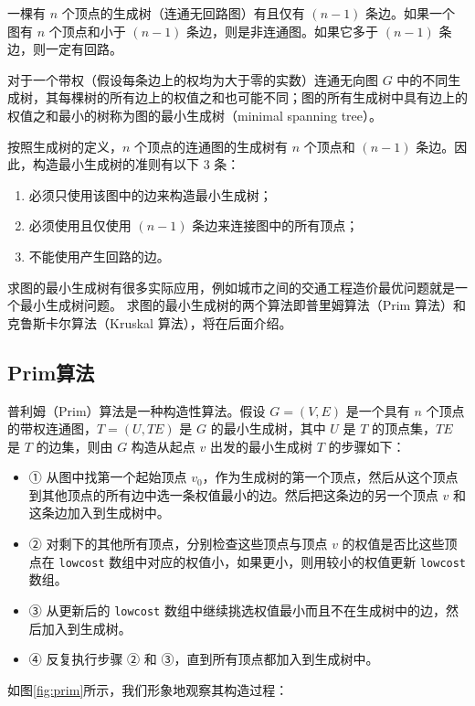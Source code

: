 \documentclass[lang=cn,newtx,10pt,scheme=chinese]{../elegantbook}
\begin{document}
一棵有 $n$ 个顶点的生成树（连通无回路图）有且仅有 $(n-1)$ 条边。如果一个图有 $n$ 个顶点和小于 $(n-1)$ 条边，则是非连通图。如果它多于 $(n-1)$ 条边，则一定有回路。

对于一个带权（假设每条边上的权均为大于零的实数）连通无向图 $G$ 中的不同生成树，其每棵树的所有边上的权值之和也可能不同；图的所有生成树中具有边上的权值之和最小的树称为图的最小生成树（minimal spanning tree）。

按照生成树的定义，$n$ 个顶点的连通图的生成树有 $n$ 个顶点和 $(n-1)$ 条边。因此，构造最小生成树的准则有以下 3 条：

\begin{enumerate}
  \item 必须只使用该图中的边来构造最小生成树；
  \item 必须使用且仅使用 $(n-1)$ 条边来连接图中的所有顶点；
  \item 不能使用产生回路的边。
\end{enumerate}

求图的最小生成树有很多实际应用，例如城市之间的交通工程造价最优问题就是一个最小生成树问题。
求图的最小生成树的两个算法即普里姆算法（Prim 算法）和克鲁斯卡尔算法（Kruskal 算法），将在后面介绍。
\subsection{Prim算法}
普利姆（Prim）算法是一种构造性算法。假设 $G = (V, E)$ 是一个具有 $n$ 个顶点的带权连通图，$T = (U, TE)$ 是 $G$ 的最小生成树，其中 $U$ 是 $T$ 的顶点集，$TE$ 是 $T$ 的边集，则由 $G$ 构造从起点 $v$ 出发的最小生成树 $T$ 的步骤如下：

\begin{itemize}
  \item ① 从图中找第一个起始顶点 $v_0$，作为生成树的第一个顶点，然后从这个顶点到其他顶点的所有边中选一条权值最小的边。然后把这条边的另一个顶点 $v$ 和这条边加入到生成树中。
  \item ② 对剩下的其他所有顶点，分别检查这些顶点与顶点 $v$ 的权值是否比这些顶点在 \texttt{lowcost} 数组中对应的权值小，如果更小，则用较小的权值更新 \texttt{lowcost} 数组。
  \item ③ 从更新后的 \texttt{lowcost} 数组中继续挑选权值最小而且不在生成树中的边，然后加入到生成树。
  \item ④ 反复执行步骤 ② 和 ③，直到所有顶点都加入到生成树中。
\end{itemize}

如图\ref{fig:prim}所示，我们形象地观察其构造过程：
\end{document}
